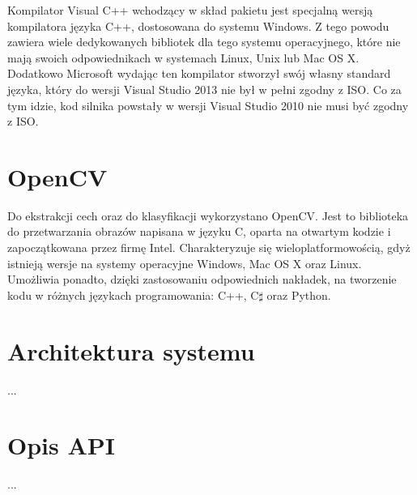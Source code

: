 Kompilator Visual C++ wchodzący w skład pakietu jest specjalną wersją kompilatora języka C++, dostosowana do systemu Windows. Z tego powodu zawiera wiele dedykowanych bibliotek dla tego systemu operacyjnego, które nie mają swoich odpowiednikach w systemach Linux, Unix lub Mac OS X. Dodatkowo Microsoft wydając ten kompilator stworzył swój własny standard języka, który do wersji Visual Studio 2013 nie był w pełni zgodny z ISO. Co za tym idzie, kod silnika powstały w wersji Visual Studio 2010 nie musi być zgodny z ISO.

\section{OpenCV}

Do ekstrakcji cech oraz do klasyfikacji wykorzystano OpenCV. Jest to biblioteka do przetwarzania obrazów napisana w języku C, oparta na otwartym kodzie i zapoczątkowana przez firmę Intel. Charakteryzuje się wieloplatformowością, gdyż istnieją wersje na systemy operacyjne Windows, Mac OS X oraz Linux. Umożliwia ponadto, dzięki zastosowaniu odpowiednich nakładek, na tworzenie kodu w różnych językach programowania: C++, C$\sharp$ oraz Python.


\section{Architektura systemu}
...

\section{Opis API}
...